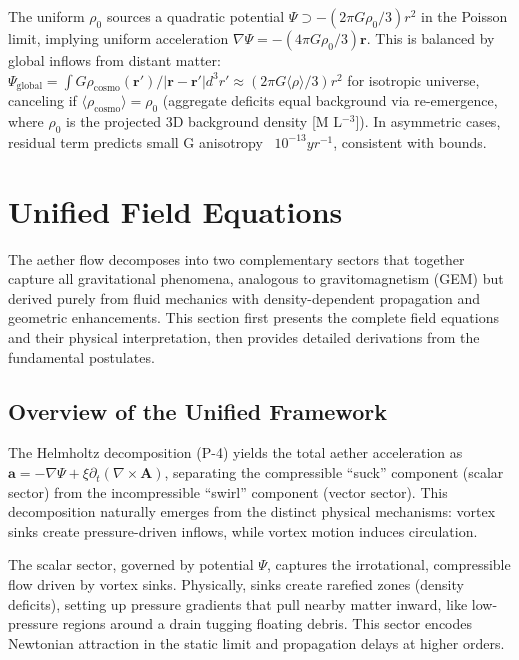 \documentclass{article}
\begin{document}
The uniform $\rho_0$ sources a quadratic potential $\Psi \supset - (2\pi G \rho_0 / 3) r^2$ in the Poisson limit, implying uniform acceleration $\nabla \Psi = - (4\pi G \rho_0 / 3) \mathbf{r}$. This is balanced by global inflows from distant matter: $\Psi_{\text{global}} = \int G \rho_{\text{cosmo}}(\mathbf{r}') / |\mathbf{r} - \mathbf{r}'| d^3 r' \approx (2\pi G \langle \rho \rangle / 3) r^2$ for isotropic universe, canceling if $\langle \rho_{\text{cosmo}} \rangle = \rho_0$ (aggregate deficits equal background via re-emergence, where $\rho_0$ is the projected 3D background density [M L$^{-3}$]). In asymmetric cases, residual term predicts small G anisotropy ~$10^{-13} yr^{-1}$, consistent with bounds.

\section{Unified Field Equations}

The aether flow decomposes into two complementary sectors that together capture all gravitational phenomena, analogous to gravitomagnetism (GEM) but derived purely from fluid mechanics with density-dependent propagation and geometric enhancements. This section first presents the complete field equations and their physical interpretation, then provides detailed derivations from the fundamental postulates.

\subsection{Overview of the Unified Framework}

The Helmholtz decomposition (P-4) yields the total aether acceleration as $\mathbf{a} = -\nabla \Psi + \xi \partial_t (\nabla \times \mathbf{A})$, separating the compressible ``suck'' component (scalar sector) from the incompressible ``swirl'' component (vector sector). This decomposition naturally emerges from the distinct physical mechanisms: vortex sinks create pressure-driven inflows, while vortex motion induces circulation.

The scalar sector, governed by potential $\Psi$, captures the irrotational, compressible flow driven by vortex sinks. Physically, sinks create rarefied zones (density deficits), setting up pressure gradients that pull nearby matter inward, like low-pressure regions around a drain tugging floating debris. This sector encodes Newtonian attraction in the static limit and propagation delays at higher orders.
\end{document}
